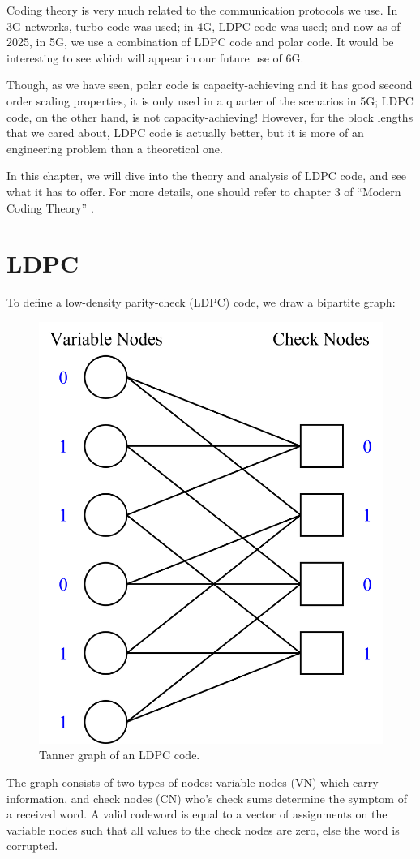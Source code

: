 
Coding theory is very much related to the communication protocols we use. In 3G networks, turbo code was used; in 4G, LDPC code was used; and now as of 2025, in 5G, we use a combination of LDPC code and polar code. It would be interesting to see which will appear in our future use of 6G.

Though, as we have seen, polar code is capacity-achieving and it has good second order scaling properties, it is only used in a quarter of the scenarios in 5G; LDPC code, on the other hand, is not capacity-achieving! However, for the block lengths that we cared about, LDPC code is actually better, but it is more of an engineering problem than a theoretical one.

In this chapter, we will dive into the theory and analysis of LDPC code, and see what it has to offer. For more details, one should refer to chapter 3 of ``Modern Coding Theory'' \cite{Modern_Coding_Theory}.

\section{LDPC}
To define a low-density parity-check (LDPC) code, we draw a bipartite graph:

\begin{figure}[H]
    \centering
    \includegraphics[width=0.4\linewidth]{figures/w10_LDPC.png}
    \caption{Tanner graph of an LDPC code.}
    \label{fig:w10_LDPC}
\end{figure}

The graph consists of two types of nodes: variable nodes (VN) which carry information, and check nodes (CN) who's check sums determine the symptom of a received word. A valid codeword is equal to a vector of assignments on the variable nodes such that all values to the check nodes are zero, else the word is corrupted.

